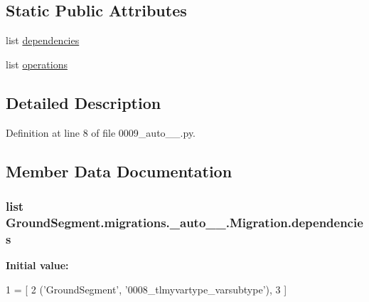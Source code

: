 \subsection*{Static Public Attributes}
\begin{DoxyCompactItemize}
\item 
list \hyperlink{class_ground_segment_1_1migrations_1_10009__auto__20161126__1856_1_1_migration_aad9e06412a03f318e6bbe739f1f2bc06}{dependencies}
\item 
list \hyperlink{class_ground_segment_1_1migrations_1_10009__auto__20161126__1856_1_1_migration_ae563dfbc8e83e838014acc3cc1b3b304}{operations}
\end{DoxyCompactItemize}


\subsection{Detailed Description}


Definition at line 8 of file 0009\+\_\+auto\+\_\+\_.\+py.



\subsection{Member Data Documentation}
\hypertarget{class_ground_segment_1_1migrations_1_10009__auto__20161126__1856_1_1_migration_aad9e06412a03f318e6bbe739f1f2bc06}{}
\subsubsection[{dependencies}]{\setlength{\rightskip}{0pt plus 5cm}list Ground\+Segment.\+migrations.\+\_\+auto\+\_\+\_.\+Migration.\+dependencies\hspace{0.3cm}{\ttfamily [static]}}\label{class_ground_segment_1_1migrations_1_10009__auto__20161126__1856_1_1_migration_aad9e06412a03f318e6bbe739f1f2bc06}
{\bfseries Initial value\+:}
\begin{DoxyCode}
1 = [
2         (\textcolor{stringliteral}{'GroundSegment'}, \textcolor{stringliteral}{'0008\_tlmyvartype\_varsubtype'}),
3     ]
\end{DoxyCode}



